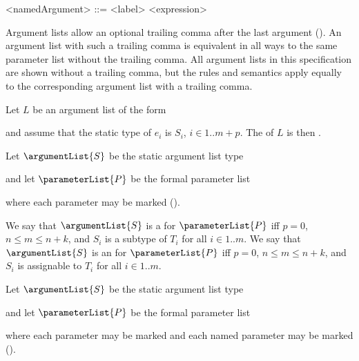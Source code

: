 \documentclass[makeidx]{article}
\begin{document}
{\begin{grammar}
<namedArgument> ::= <label> <expression>
\end{grammar}

\LMHash{}%
Argument lists allow an optional trailing comma after the last argument
().
An argument list with such a trailing comma is equivalent in all ways to
the same parameter list without the trailing comma.
All argument lists in this specification are shown without a trailing comma,
but the rules and semantics apply equally to
the corresponding argument list with a trailing comma.

\LMHash{}%
Let $L$ be an argument list of the form

\noindent
{}

\noindent
and assume that the static type of $e_i$ is $S_i$, $i \in 1 .. m+p$.
The  of $L$ is then
.

\LMHash{}%
Let $\argumentList{S}$ be the static argument list type

\noindent
{}

\noindent
and let $\parameterList{P}$ be the formal parameter list

\noindent
{}

\noindent
where each parameter may be marked \COVARIANT{}
().

\LMHash{}%
We say that $\argumentList{S}$ is
a  for $\parameterList{P}$
if{}f $p = 0$, $n \leq m \leq n+k$, and $S_i$ is
a subtype of $T_i$ for all $i \in 1 .. m$.
We say that $\argumentList{S}$ is
an  for $\parameterList{P}$
if{}f $p = 0$, $n \leq m \leq n+k$, and $S_i$ is
assignable to $T_i$ for all $i \in 1 .. m$.

\LMHash{}%
Let $\argumentList{S}$ be the static argument list type

\noindent
{}

\noindent
and let $\parameterList{P}$ be the formal parameter list

\noindent
{}

\noindent
where each parameter may be marked \COVARIANT{}
and each named parameter may be marked \REQUIRED{}
().

}
\end{document}
